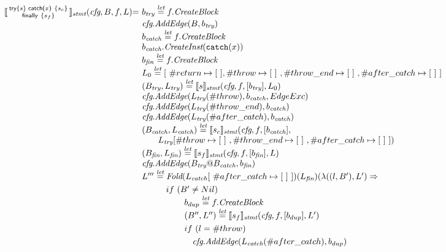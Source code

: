 \[\begin{array}{l@{}l@{~}l}
\transfun{\irtryfull{s}{x}{s_c}{s_f}}_{\emph{stmt}}(\emph{cfg}, B, f, L) & = &
b_{\emph{try}} \letval f.\emph{CreateBlock}\\
& & \emph{cfg}.\emph{AddEdge}(B, b_{\emph{try}})\\
& & b_{\emph{catch}} \letval f.\emph{CreateBlock}\\
& & b_{\emph{catch}}.\emph{CreateInst}(\TT{catch}(x))\\
& & b_{\emph{fin}} \letval f.\emph{CreateBlock}\\
& & L_0 \letval [\ \#return \mapsto [\ ], \#throw \mapsto [\ ]\ , \#throw\_end \mapsto [\ ]\ , \#after\_catch \mapsto [\ ]\ ] \\
& & (B_{\emph{try}}, L_{\emph{try}}) \letval \transfun{s}_{\emph{stmt}}(\emph{cfg}, f, [b_{\emph{try}}], L_0)\\
& & \emph{cfg}.\emph{AddEdge}(L_{\emph{try}}(\#throw),b_{\emph{catch}}, EdgeExc)\\
& & \emph{cfg}.\emph{AddEdge}(L_{\emph{try}}(\#throw\_end),b_{\emph{catch}})\\
& & \emph{cfg}.\emph{AddEdge}(L_{\emph{try}}(\#after\_catch),b_{\emph{catch}})\\
& & (B_{\emph{catch}},L_{\emph{catch}}) \letval \transfun{s_c}_{\emph{stmt}}(\emph{cfg}, f, [b_{\emph{catch}}],\\
& & \phantom{ifif} L_{\emph{try}}[\#throw \mapsto [\ ]\ , \#throw\_end \mapsto [\ ]\ , \#after\_catch \mapsto [\ ]\ ])\\
& & (B_{\emph{fin}},L_{\emph{fin}}) \letval \transfun{s_f}_{\emph{stmt}}(\emph{cfg}, f, [b_{\emph{fin}}], L)\\
& & \emph{cfg}.\emph{AddEdge}(B_{\emph{try}}@B_{\emph{catch}},b_{\emph{fin}})\\
& & L''' \letval \Fold(L_{\emph{catch}}[\ \#after\_catch \mapsto [\ ]\ ])(L_{\emph{fin}})(\lambda((l,B'),L') \Rightarrow\\
& & \phantom{L_{\emph{fin}} \letval}if\ (B' \neq Nil)\\
& & \phantom{L_{\emph{fin}} \letval \Fold} b_{dup} \letval f.\emph{CreateBlock}\\
& & \phantom{L_{\emph{fin}} \letval \Fold} (B'',L'') \letval \transfun{s_f}_{\emph{stmt}}(\emph{cfg}, f, [b_{dup}], L')\\
& & \phantom{L_{\emph{fin}} \letval \Fold}if\ (l = \#throw)\\
& & \phantom{L_{\emph{fin}} \letval \Fold if} \emph{cfg}.\emph{AddEdge}(L_{\emph{catch}}(\#after\_catch),b_{dup})\\

\end{array}\]
